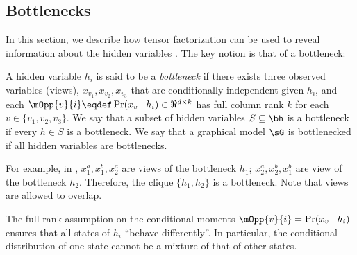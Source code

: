 \subsection{Bottlenecks}

In this section, we describe how tensor factorization
can be used to reveal information about the hidden
variables \citep{anandkumar13tensor}.  The key notion is that of a bottleneck:

\begin{definition}[Bottleneck]
  A hidden variable $h_i$ is said to be a \emph{bottleneck} if there
  exists three observed variables (views), $x_{v_1}, x_{v_2}, x_{v_3}$
  that are conditionally independent given $h_i$,
  and each $\mOpp{v}{i} \eqdef \Pr(x_v \mid h_i) \in \Re^{d \times k}$ has full column rank $k$
  for each $v \in \{v_1, v_2, v_3\}$.
  We say that a subset of hidden variables $S \subseteq \bh$ is a bottleneck
  if every $h \in S$ is a bottleneck.
  We say that a graphical model $\sG$ is bottlenecked if all hidden variables
  are bottlenecks.
\end{definition}
For example, in , $x_1^a,x_1^b,x_2^a$ are views of the bottleneck $h_1$;
$x_2^a,x_2^b,x_1^b$ are view of the bottleneck $h_2$.  Therefore, the clique
$\{h_1,h_2\}$ is a bottleneck.  Note that views are allowed to overlap.


The full rank assumption on the conditional moments $\mOpp{v}{i} = \Pr(x_v \mid h_i)$
ensures that all states of $h_i$ ``behave differently''.
In particular, the conditional distribution of one state cannot be
a mixture of that of other states.

